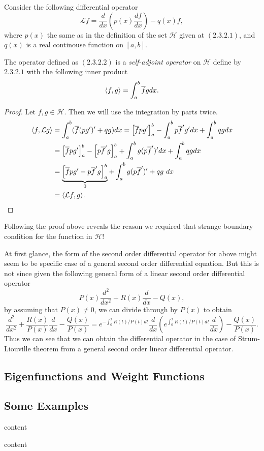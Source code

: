 \noindent Consider the following differential operator
\[  \mathcal{L} f = \frac{d}{dx}(p(x)\frac{df}{dx}) - q(x)f, \tag{2.3.2.2}\]
where $p(x)$ the same as in the definition of the set $\mathscr{H}$ given at $(2.3.2.1)$, and $q(x)$ is a real continouse function on $[a,b]$. 

\begin{proposition}
	The operator defined as $(2.3.2.2)$ is a \emph{self-adjoint operator} on $\mathscr{H}$ define by $2.3.2.1$ with the following inner product
	\[ \langle f, g \rangle = \int_{a}^{b} \overline{f}g dx. \]
\end{proposition}

\begin{proof}
	Let $f,g \in \mathscr{H}$. Then we will use the integration by parts twice.
	\begin{align*}
		\langle f, \mathcal{L}g \rangle &= \int_{a}^{b} (\overline{f}(pg')' + qg)dx = \left[ \overline{f}pg' \right]_a^b - \int_{a}^{b}p\overline{f}'g'dx + \int_{a}^{b}qgdx \\
		&= \left[ \overline{f}pg' \right]_a^b - \left[ p\overline{f}'g \right]_a^b + \int_{a}^{b}g(p\overline{f}')' dx + \int_{a}^{b}qgdx\\
		&=\underbrace{ \left[ \overline{f}pg' - p\overline{f}'g \right]_a^b}_{0} + \int_{a}^{b}g(p\overline{f}')' + qg\ dx \\
		&= \langle \mathcal{L}f, g \rangle.
	\end{align*}
\end{proof}
\begin{remark}
	Following the proof above reveals the reason we required that strange boundary condition for the function in $\mathscr{H}$!
\end{remark}




\begin{remark}
	At first glance, the form of the second order differential operator for above might seem to be specific case of a general second order differential equation. But this is not since given the following general form of a linear second order differential operator
	\[ P(x)\frac{d^2}{dx^2} + R(x)\frac{d}{dx} - Q(x), \]
	by assuming that $P(x) \neq 0$, we can divide through by $P(x)$ to obtain
	\[ \frac{d^2}{dx^2} + \frac{R(x)}{P(x)}\frac{d}{dx} - \frac{Q(x)}{P(x)} = e^{-\int_{0}^{x}R(t)/P(t)dt}\frac{d}{dx}(e^{\int_{0}^{x}R(t)/P(t)dt}\frac{d}{dx})-\frac{Q(x)}{P(x)}. \]
	Thus we can see that we can obtain the differential operator in the case of Strum-Liouville theorem from a general second order linear differential operator.
\end{remark}

\subsection{Eigenfunctions and Weight Functions}




\subsection{Some Examples}
\begin{example}
	content
\end{example}
\begin{example}
	content
\end{example}
